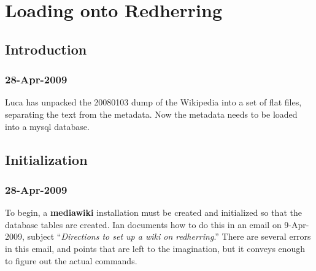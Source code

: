 \chapter{Loading onto Redherring}

\section{Introduction}

\subsection{28-Apr-2009}

Luca has unpacked the 20080103 dump of the Wikipedia into
a set of flat files, separating the text from the metadata.
Now the metadata needs to be loaded into a mysql database.

\section{Initialization}

\subsection{28-Apr-2009}

To begin, a \textbf{mediawiki} installation must be created and
initialized so that the database tables are created.
Ian documents how to do this in an email on 9-Apr-2009,
subject ``\textit{Directions to set up a wiki on redherring}.''
There are several errors in this email, and points that are
left to the imagination, but it conveys enough to figure
out the actual commands.

